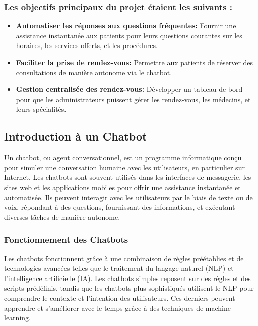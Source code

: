 \subsubsection{Les objectifs principaux du projet étaient les suivants :}
\begin{itemize}
  \item \textbf{Automatiser les réponses aux questions fréquentes: }Fournir une assistance instantanée aux patients pour leurs questions courantes sur les horaires, les services offerts, et les procédures.
  \item \textbf{Faciliter la prise de rendez-vous: }Permettre aux patients de réserver des consultations de manière autonome via le chatbot.
  \item \textbf{Gestion centralisée des rendez-vous: }Développer un tableau de bord pour que les administrateurs puissent gérer les rendez-vous, les médecins, et leurs spécialités.
\end{itemize}

\subsection{Introduction à un Chatbot}

\hspace{16pt}Un chatbot, ou agent conversationnel, est un programme informatique conçu pour simuler une conversation humaine avec les utilisateurs, en particulier sur Internet. Les chatbots sont souvent utilisés dans les interfaces de messagerie, les sites web et les applications mobiles pour offrir une assistance instantanée et automatisée. Ils peuvent interagir avec les utilisateurs par le biais de texte ou de voix, répondant à des questions, fournissant des informations, et exécutant diverses tâches de manière autonome.

\subsubsection{Fonctionnement des Chatbots}

\hspace{16pt}Les chatbots fonctionnent grâce à une combinaison de règles préétablies et de technologies avancées telles que le traitement du langage naturel (NLP) et l'intelligence artificielle (IA). Les chatbots simples reposent sur des règles et des scripts prédéfinis, tandis que les chatbots plus sophistiqués utilisent le NLP pour comprendre le contexte et l'intention des utilisateurs. Ces derniers peuvent apprendre et s'améliorer avec le temps grâce à des techniques de machine learning.

